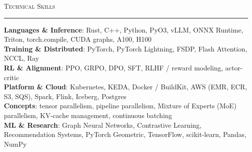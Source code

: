 \documentclass[letterpaper]{article}
\renewcommand{\section}[1]{%
  \vspace{6pt}\noindent%
  {\large\scshape\textcolor{accentdark}{#1}}\par\vspace{-5pt}%
  {\color{accent}\rule{\textwidth}{1pt}}%
  \vspace{2pt}\par%
}
\begin{document}
%
\section{Technical Skills}
 \begin{itemize}[leftmargin=0.15in, label={}]
    \small{\item{
     \textbf{Languages \& Inference}{: Rust, C++, Python, PyO3, vLLM, ONNX Runtime, Triton, torch.compile, CUDA graphs, A100, H100} \\
     \textbf{Training \& Distributed}{: PyTorch, PyTorch Lightning, FSDP, Flash Attention, NCCL, Ray} \\
     \textbf{RL \& Alignment}{: PPO, GRPO, DPO, SFT, RLHF / reward modeling, actor-critic} \\
     \textbf{Platform \& Cloud}{: Kubernetes, KEDA, Docker / BuildKit, AWS (EMR, ECR, S3, SQS), Spark, Flink, Iceberg, Postgres} \\
     \textbf{Concepts}{: tensor parallelism, pipeline parallelism, Mixture of Experts (MoE) parallelism, KV-cache management, continuous batching} \\
     \textbf{ML \& Research}{: Graph Neural Networks, Contrastive Learning, Recommendation Systems, PyTorch Geometric, TensorFlow, scikit-learn, Pandas, NumPy}
    }}
 \end{itemize}

\end{document}
